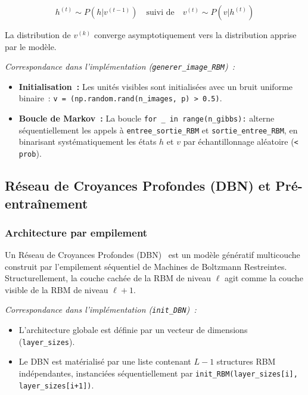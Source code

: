 \documentclass[11pt,a4paper]{article}
\renewcommand{\texttt}[1]{\urlstyle{tt}\nolinkurl{#1}}
\begin{document}
\begin{equation}
h^{(t)} \sim P(h|v^{(t-1)}) \quad \text{suivi de} \quad v^{(t)} \sim P(v|h^{(t)})
\label{eq:gibbs}
\end{equation}

La distribution de $v^{(k)}$ converge asymptotiquement vers la distribution apprise par le mod\`ele.

\noindent\textit{Correspondance dans l'impl\'ementation (\texttt{generer\_image\_RBM})~:}
\begin{itemize}
    \item \textbf{Initialisation~:} Les unit\'es visibles sont initialis\'ees avec un bruit uniforme binaire~: \texttt{v = (np.random.rand(n\_images, p) > 0.5)}.
    \item \textbf{Boucle de Markov~:} La boucle \texttt{for \_ in range(n\_gibbs):} alterne s\'equentiellement les appels \`a \texttt{entree\_sortie\_RBM} et \texttt{sortie\_entree\_RBM}, en binarisant syst\'ematiquement les \'etats $h$ et $v$ par \'echantillonnage al\'eatoire (\texttt{< prob}).
\end{itemize}

\subsection{R\'eseau de Croyances Profondes (DBN) et Pr\'e-entra\^inement}
\label{sec:dbn_theory}

\subsubsection{Architecture par empilement}

Un R\'eseau de Croyances Profondes (DBN)~\cite{hinton2006} est un mod\`ele g\'en\'eratif multicouche construit par l'empilement s\'equentiel de Machines de Boltzmann Restreintes. Structurellement, la couche cach\'ee de la RBM de niveau $\ell$ agit comme la couche visible de la RBM de niveau $\ell + 1$.

\noindent\textit{Correspondance dans l'impl\'ementation (\texttt{init\_DBN})~:}
\begin{itemize}
    \item L'architecture globale est d\'efinie par un vecteur de dimensions (\texttt{layer\_sizes}).
    \item Le DBN est mat\'erialis\'e par une liste contenant $L - 1$ structures RBM ind\'ependantes, instanci\'ees s\'equentiellement par \texttt{init\_RBM(layer\_sizes[i], layer\_sizes[i+1])}.
\end{itemize}
\end{document}

